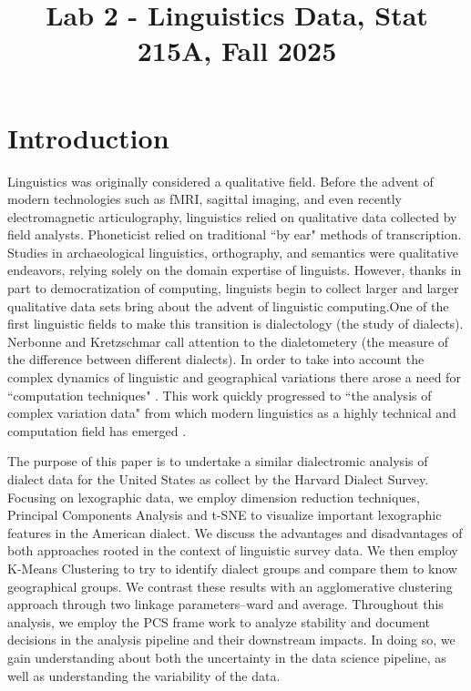 \documentclass[10pt,letterpaper]{article}
\title{Lab 2 - Linguistics Data, Stat 215A, Fall 2025\vspace{-2em}}
\begin{document}
\maketitle


\section{Introduction}\label{introduction}

Linguistics was originally considered a qualitative field. Before the advent of modern technologies such as fMRI, sagittal imaging, and even recently electromagnetic articulography, linguistics relied on qualitative data collected by field analysts. Phoneticist relied on traditional ``by ear" methods of transcription. Studies in archaeological linguistics, orthography, and semantics were qualitative endeavors, relying solely on the domain expertise of linguists. However, thanks in part to democratization of computing, linguists begin to collect larger and larger qualitative data sets bring about the advent of linguistic computing.One of the first linguistic fields to make this transition is dialectology (the study of dialects). Nerbonne and Kretzschmar call attention to the dialetometery (the measure of the difference between different dialects\cite{nerbonne_introducing_2003}). In order to take into account the complex dynamics of linguistic and geographical variations there arose a need for ``computation techniques" \cite{nerbonne_introducing_2003}. This work quickly progressed to ``the analysis of complex variation data" from which modern linguistics as a highly technical and computation field has emerged \cite{nerbonne_progress_2006}.

The purpose of this paper is to undertake a similar dialectromic analysis of dialect data for the United States as collect by the Harvard Dialect Survey. Focusing on lexographic data, we employ dimension reduction techniques, Principal Components Analysis and t-SNE to visualize important lexographic features in the American dialect. We discuss the advantages and disadvantages of both approaches rooted in the context of linguistic survey data. We then employ K-Means Clustering to try to identify dialect groups and compare them to know geographical groups. We contrast these results with an agglomerative clustering approach through two linkage parameters--ward and average. Throughout this analysis, we employ the PCS frame work to analyze stability and document decisions in the analysis pipeline and their downstream impacts\cite{yu2024veridical}. In doing so, we gain understanding about both the uncertainty in the data science pipeline, as well as understanding the variability of the data. 
\end{document}
